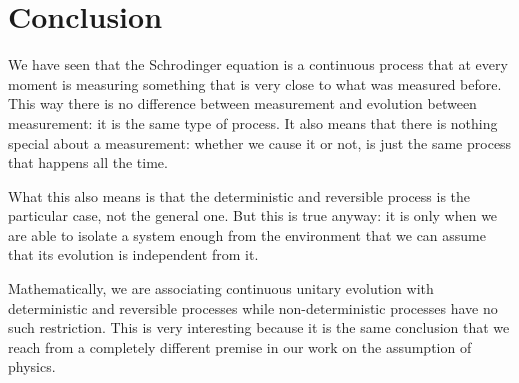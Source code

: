 \documentclass[aps,pra,10pt,floatfix,nofootinbib]{revtex4-1}
\theoremstyle{definition}
\begin{document}
\section{Conclusion}

We have seen that the Schrodinger equation is a continuous process that at every moment is measuring something that is very close to what was measured before. This way there is no difference between measurement and evolution between measurement: it is the same type of process. It also means that there is nothing special about a measurement: whether we cause it or not, is just the same process that happens all the time.

What this also means is that the deterministic and reversible process is the particular case, not the general one. But this is true anyway: it is only when we are able to isolate a system enough from the environment that we can assume that its evolution is independent from it.

Mathematically, we are associating continuous unitary evolution with deterministic and reversible processes while non-deterministic processes have no such restriction. This is very interesting because it is the same conclusion that we reach from a completely different premise in our work on the assumption of physics.
\end{document}
